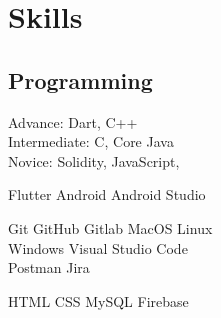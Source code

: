 \documentclass[]{deedy-resume-openfont}
\begin{document}
\begin{minipage}[t]{0.33\textwidth} 



\section{Skills}
\subsection{Programming}

\textbullet{}  Advance: Dart, C++  \\
\textbullet{}  Intermediate: C, Core Java  \\
\textbullet{}  Novice: Solidity, JavaScript, \\
\sectionsep

\textbullet{} Flutter \textbullet{} Android \textbullet{} Android Studio  \\
\sectionsep

\textbullet{} Git \textbullet{} GitHub \textbullet{} Gitlab \textbullet{} MacOS \textbullet{} Linux \\
\textbullet{} Windows \textbullet{} Visual Studio Code \\
\textbullet{} Postman \textbullet{} Jira \\
\sectionsep

\textbullet{} HTML \textbullet{} CSS \textbullet{} MySQL \textbullet{} Firebase  \\
\sectionsep








\end{minipage}
\end{document}
